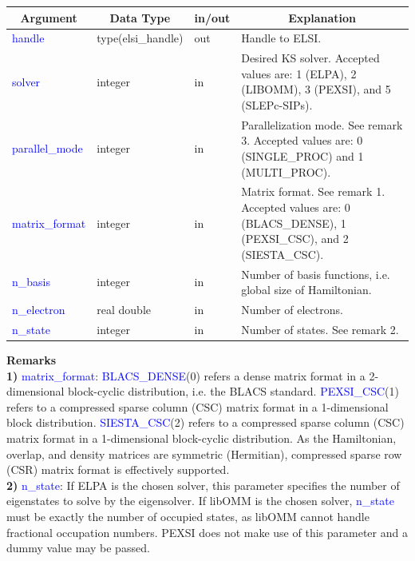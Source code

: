 \documentclass{report}
\begin{document}
\begin{tabular}[]{|p{30mm}|p{30mm}|p{15mm}|p{90mm}|}
\hline
\multicolumn{1}{|c|}{\textbf{Argument}} & \multicolumn{1}{c|}{\textbf{Data Type}} & \multicolumn{1}{c|}{\textbf{in/out}} & \multicolumn{1}{c|}{\textbf{Explanation}}\\
\hline
\textcolor{blue}{handle}         & type(elsi\_handle) & out & Handle to ELSI.\\
\hline
\textcolor{blue}{solver}         & integer            & in  & Desired KS solver.  Accepted values are:  1 (ELPA), 2 (LIBOMM), 3 (PEXSI), and 5 (SLEPc-SIPs).\\
\hline
\textcolor{blue}{parallel\_mode} & integer            & in  & Parallelization mode.  See remark 3.  Accepted values are:  0 (SINGLE\_PROC) and 1 (MULTI\_PROC).\\
\hline
\textcolor{blue}{matrix\_format} & integer            & in  & Matrix format.  See remark 1.  Accepted values are:  0 (BLACS\_DENSE), 1 (PEXSI\_CSC), and 2 (SIESTA\_CSC).\\
\hline
\textcolor{blue}{n\_basis}       & integer            & in  & Number of basis functions, i.e. global size of Hamiltonian.\\
\hline
\textcolor{blue}{n\_electron}    & real double        & in  & Number of electrons.\\
\hline
\textcolor{blue}{n\_state}       & integer            & in  & Number of states.  See remark 2.\\
\hline
\end{tabular}

\bigskip
\textbf{Remarks}\\

\textbf{1)} \textcolor{blue}{matrix\_format}:  \textcolor{blue}{BLACS\_DENSE}(0) refers a dense matrix format in a 2-dimensional block-cyclic distribution, i.e. the BLACS standard.  \textcolor{blue}{PEXSI\_CSC}(1) refers to a compressed sparse column (CSC) matrix format in a 1-dimensional block distribution.  \textcolor{blue}{SIESTA\_CSC}(2) refers to a compressed sparse column (CSC) matrix format in a 1-dimensional block-cyclic distribution.  As the Hamiltonian, overlap, and density matrices are symmetric (Hermitian), compressed sparse row (CSR) matrix format is effectively supported.\\

\textbf{2)} \textcolor{blue}{n\_state}:  If ELPA is the chosen solver, this parameter specifies the number of eigenstates to solve by the eigensolver.  If libOMM is the chosen solver, \textcolor{blue}{n\_state} must be exactly the number of occupied states, as libOMM cannot handle fractional occupation numbers\cite{libomm_corsetti_2014}.  PEXSI does not make use of this parameter and a dummy value may be passed.\\
\end{document}
